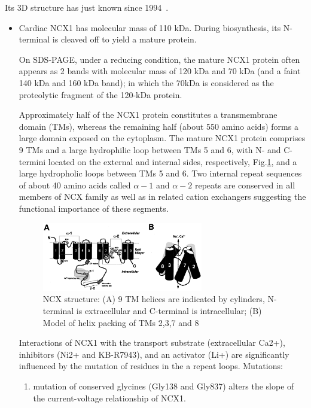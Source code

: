 Its 3D structure has just known since 1994~\citep{}.
\begin{itemize}
  \item  Cardiac NCX1 has molecular mass of 110 kDa. During biosynthesis, its N-terminal
is cleaved off to yield a mature protein.

On SDS-PAGE, under a reducing condition, the mature NCX1 protein often appears
as 2 bands with molecular mass of 120 kDa and 70 kDa (and a faint 140 kDa and
160 kDa band); in which the 70kDa is considered as the proteolytic fragment of
the 120-kDa protein.

Approximately half of the NCX1 protein constitutes a transmembrane domain (TMs),
whereas the remaining half (about 550 amino acids) forms a large domain exposed
on the cytoplasm. The mature NCX1 protein comprises 9 TMs and a large
hydrophilic loop between TMs 5 and 6, with N- and C-termini located on the
external and internal sides, respectively, Fig.\ref{fig:NCX-structure}, and a
large hydropholic loops between TMs 5 and 6.
Two internal repeat sequences of about 40 amino acids called $\alpha-1$ and
$\alpha-2$ repeats are conserved in all members of NCX family as well as in
related cation exchangers suggesting the functional importance of these
segments. 

\begin{figure}[hbt]
  \centerline{\includegraphics[height=3cm,
    angle=0]{./images/NCX-structure.eps}}
\caption{NCX structure: (A) 9 TM helices are indicated by cylinders, N-terminal
is extracellular and C-terminal is intracellular; (B) Model of helix packing of
TMs 2,3,7 and 8 \citep{shigekawa2001}}
\label{fig:NCX-structure}
\end{figure}

Interactions of NCX1 with the transport substrate
(extracellular Ca2+), inhibitors (Ni2+ and KB-R7943), and an
activator (Li+) are significantly influenced by the mutation of
residues in the a repeat loops. Mutations:
\begin{enumerate}
  \item mutation of conserved glycines (Gly138 and Gly837) alters the slope of
  the current-voltage relationship of NCX1. 
  

\end{enumerate}
\end{itemize}
